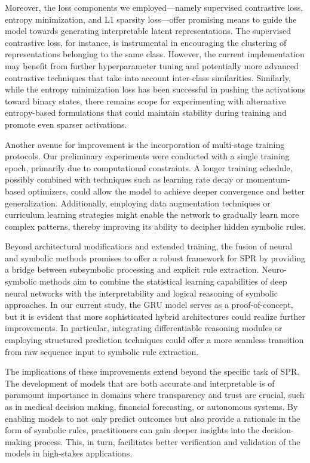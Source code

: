 \documentclass[12pt]{article}
\begin{document}
Moreover, the loss components we employed—namely supervised contrastive loss, entropy minimization, and L1 sparsity loss—offer promising means to guide the model towards generating interpretable latent representations. The supervised contrastive loss, for instance, is instrumental in encouraging the clustering of representations belonging to the same class. However, the current implementation may benefit from further hyperparameter tuning and potentially more advanced contrastive techniques that take into account inter-class similarities. Similarly, while the entropy minimization loss has been successful in pushing the activations toward binary states, there remains scope for experimenting with alternative entropy-based formulations that could maintain stability during training and promote even sparser activations.

Another avenue for improvement is the incorporation of multi-stage training protocols. Our preliminary experiments were conducted with a single training epoch, primarily due to computational constraints. A longer training schedule, possibly combined with techniques such as learning rate decay or momentum-based optimizers, could allow the model to achieve deeper convergence and better generalization. Additionally, employing data augmentation techniques or curriculum learning strategies might enable the network to gradually learn more complex patterns, thereby improving its ability to decipher hidden symbolic rules.

Beyond architectural modifications and extended training, the fusion of neural and symbolic methods promises to offer a robust framework for SPR by providing a bridge between subsymbolic processing and explicit rule extraction. Neuro-symbolic methods aim to combine the statistical learning capabilities of deep neural networks with the interpretability and logical reasoning of symbolic approaches. In our current study, the GRU model serves as a proof-of-concept, but it is evident that more sophisticated hybrid architectures could realize further improvements. In particular, integrating differentiable reasoning modules or employing structured prediction techniques could offer a more seamless transition from raw sequence input to symbolic rule extraction.

The implications of these improvements extend beyond the specific task of SPR. The development of models that are both accurate and interpretable is of paramount importance in domains where transparency and trust are crucial, such as in medical decision making, financial forecasting, or autonomous systems. By enabling models to not only predict outcomes but also provide a rationale in the form of symbolic rules, practitioners can gain deeper insights into the decision-making process. This, in turn, facilitates better verification and validation of the models in high-stakes applications.
\end{document}
